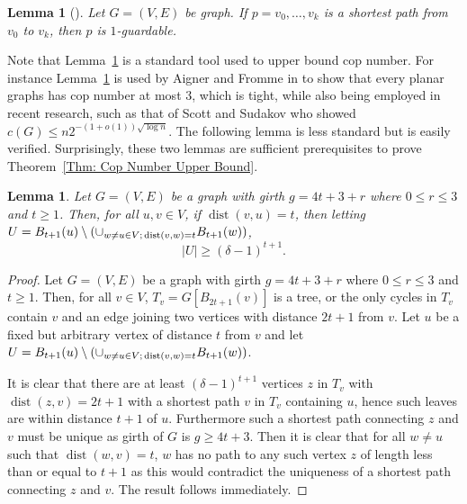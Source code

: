 \documentclass{amsart}
\DeclareMathOperator{\dist}{dist}
\newtheorem{lemma}[theorem]{Lemma}
\theoremstyle{definition}
\begin{document}
\begin{lemma}[\cite{aigner1984game}]\label{Lemma: Geodesic Path}
Let $G = (V,E)$ be graph. If $p = v_0,\dots, v_k$ is a shortest path from $v_0$ to $v_k$, then $p$ is $1$-guardable.
\end{lemma}


Note that Lemma~\ref{Lemma: Geodesic Path} is a standard tool used to upper bound cop number. For instance Lemma~\ref{Lemma: Geodesic Path} is used by Aigner and  Fromme in \cite{aigner1984game} to show that every planar graphs has cop number at most $3$, which is tight, while also being employed in recent research, such as that of Scott and Sudakov \cite{scott2011bound} who showed $c(G) \leq n 2^{-(1+o(1))\sqrt{\log{n}}}$. The following lemma is less standard but is easily verified. Surprisingly, these two lemmas are sufficient prerequisites to prove Theorem~\ref{Thm: Cop Number Upper Bound}. 



\begin{lemma}\label{Lemma: Given u_{t}}
Let $G = (V,E)$ be a graph with girth $g = 4t+3 + r$ where $0 \leq r \leq 3$ and $t \geq 1$. Then, for all $u,v\in V$, if $\dist(v,u) = t$, then letting $U = B_{t+1}(u) \setminus (\cup_{w\neq u \in V;\\ \dist(v,w)=t}B_{t+1}(w))$,
\[
 |U|  \geq (\delta-1)^{t+1}.
\]
\end{lemma}

\begin{proof}
Let $G = (V,E)$ be a graph with girth $g = 4t+3+ r$ where $0 \leq r \leq 3$ and $t \geq 1$.  Then, for all $v \in V$, $T_v = G[B_{2t+1}(v)]$ is a tree, or the only cycles in $T_v$ contain $v$ and an edge joining two vertices with distance $2t+1$ from $v$. Let $u$ be a fixed but arbitrary vertex of distance $t$ from $v$ and let $U = B_{t+1}(u) \setminus (\cup_{w\neq u \in V;\\ \dist(v,w)=t}B_{t+1}(w))$.

It is clear that there are at least $(\delta-1)^{t+1}$ vertices $z$ in $T_v$ with $\dist(z,v) = 2t+1$ with a shortest path $v$ in $T_v$ containing $u$, hence such leaves are within distance $t+1$ of $u$. Furthermore such a shortest path connecting $z$ and $v$ must be unique as girth of $G$ is $g \geq 4t +3$. Then it is clear that for all $w \neq u$ such that $\dist(w,v) = t$, $w$ has no path to any such vertex $z$ of length less than or equal to $t+1$ as this would contradict the uniqueness of a shortest path connecting $z$ and $v$. The result follows immediately.
\end{proof}
\end{document}
